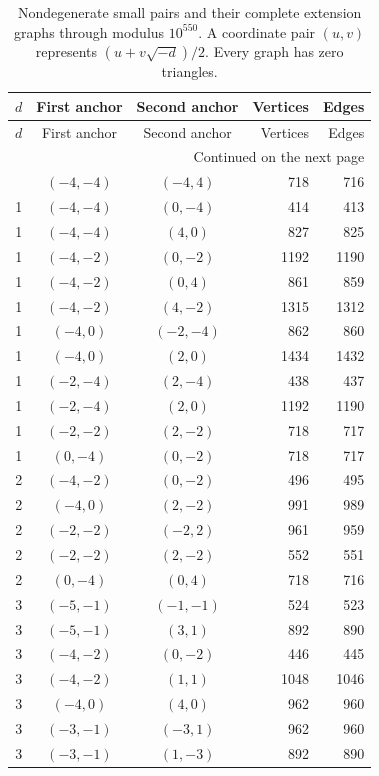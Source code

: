 \documentclass[12pt]{article}
\numberwithin{equation}{section}
\begin{document}
\begin{longtable}{rccrr}
\caption{Nondegenerate small pairs and their complete extension graphs through modulus $10^{550}$. A coordinate pair $(u,v)$ represents $(u+v\sqrt{-d})/2$. Every graph has zero triangles.}\label{sm:bs7-pair-table}\\
\toprule
$d$ & First anchor & Second anchor & Vertices & Edges\\
\midrule
\endfirsthead
\toprule
$d$ & First anchor & Second anchor & Vertices & Edges\\
\midrule
\endhead
\midrule
\multicolumn{5}{r}{Continued on the next page}\\
\endfoot
\bottomrule
\endlastfoot
1 & $(-4,-4)$ & $(-4,4)$ & 718 & 716 \\
1 & $(-4,-4)$ & $(0,-4)$ & 414 & 413 \\
1 & $(-4,-4)$ & $(4,0)$ & 827 & 825 \\
1 & $(-4,-2)$ & $(0,-2)$ & 1192 & 1190 \\
1 & $(-4,-2)$ & $(0,4)$ & 861 & 859 \\
1 & $(-4,-2)$ & $(4,-2)$ & 1315 & 1312 \\
1 & $(-4,0)$ & $(-2,-4)$ & 862 & 860 \\
1 & $(-4,0)$ & $(2,0)$ & 1434 & 1432 \\
1 & $(-2,-4)$ & $(2,-4)$ & 438 & 437 \\
1 & $(-2,-4)$ & $(2,0)$ & 1192 & 1190 \\
1 & $(-2,-2)$ & $(2,-2)$ & 718 & 717 \\
1 & $(0,-4)$ & $(0,-2)$ & 718 & 717 \\
2 & $(-4,-2)$ & $(0,-2)$ & 496 & 495 \\
2 & $(-4,0)$ & $(2,-2)$ & 991 & 989 \\
2 & $(-2,-2)$ & $(-2,2)$ & 961 & 959 \\
2 & $(-2,-2)$ & $(2,-2)$ & 552 & 551 \\
2 & $(0,-4)$ & $(0,4)$ & 718 & 716 \\
3 & $(-5,-1)$ & $(-1,-1)$ & 524 & 523 \\
3 & $(-5,-1)$ & $(3,1)$ & 892 & 890 \\
3 & $(-4,-2)$ & $(0,-2)$ & 446 & 445 \\
3 & $(-4,-2)$ & $(1,1)$ & 1048 & 1046 \\
3 & $(-4,0)$ & $(4,0)$ & 962 & 960 \\
3 & $(-3,-1)$ & $(-3,1)$ & 962 & 960 \\
3 & $(-3,-1)$ & $(1,-3)$ & 892 & 890 \\

\end{longtable}
\end{document}
